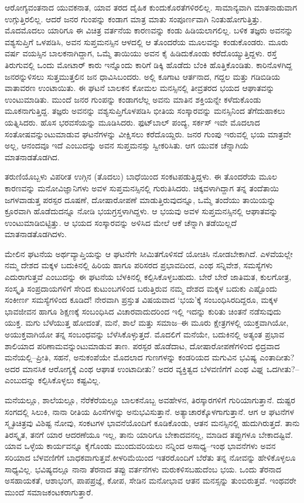 ಆರೋಗ್ಯವಂತನಾದ ಯುವಕನಾತ, ಯಾವ ತರದ ದೈಹಿಕ ಕುಂದುಕೊರತೆಗಳಿರಲಿಲ್ಲ. ಸಾಮಾನ್ಯವಾಗಿ ಮಾತನಾಡುವಾಗ ಉಗ್ಗುತ್ತಿರಲಿಲ್ಲ. ಆದರೆ ಜನರ ಗುಂಪನ್ನು ಕಂಡಾಗ ಮಾತ್ರ ಮಾತು ಸಂಪೂರ್ಣವಾಗಿ ನಿಂತುಹೋಗುತ್ತಿತ್ತು. ಮೊದಮೊದಲು ಯಾರಿಗೂ ಈ ವಿಚಿತ್ರ ವರ್ತನೆಯ ಕಾರಣವನ್ನು ಕಂಡು ಹಿಡಿಯಲಾಗಲಿಲ್ಲ. ಬಳಿಕ ತಜ್ಞರು ಅವನನ್ನು ವಶ್ಯಸುಪ್ತಿಗೆ ಒಳಪಡಿಸಿ, ಅವನ ಸುಪ್ತಮನಸ್ಸಿನ ಆಳದಲ್ಲಿ ಆ ತೊಂದರೆಯ ಮೂಲವನ್ನು ಕಂಡುಕೊಂಡರು. ಮೂರು ವರ್ಷ ವಯಸ್ಸಿನ ಬಾಲಕನಾಗಿದ್ದಾಗ, ಒಮ್ಮೆ ತಾಯಿಯು ಅವನ ಕೈ ಹಿಡಿದುಕೊಂಡು ಕರೆದೊಯ್ಯು\-ತ್ತಿದ್ದಳು. ರಸ್ತೆ ತಿರುಗುವಲ್ಲಿ ಒಂದು ಮೋಟಾರ್ ಕಾರು ಇನ್ನೊಂದು ಕಾರಿಗೆ ಡಿಕ್ಕಿ ಹೊಡೆದು ಬೆಂಕಿ ಹೊತ್ತಿ\-ಕೊಂಡಿತು. ಕಾರಿನೊಳಗಿದ್ದ ಜನರನ್ನುಳಿಸಲು ಸುತ್ತಮುತ್ತಲಿನ ಜನ ಧಾವಿಸಿ\-ಬಂದರು. ಅಲ್ಲಿ ಕೂಗಾಟ ಆರ್ತನಾದ, ಗದ್ದಲ ಮತ್ತು ಗಡಿಬಿಡಿಯ ವಾತಾವರಣ ಉಂಟಾಯಿತು. ಈ ಘಟನೆ ಬಾಲಕನ ಕೋಮಲ ಮನಸ್ಸಿನಲ್ಲಿ ತೀವ್ರತರದ ಭಯದ ಆಘಾತವನ್ನು ಉಂಟುಮಾಡಿತು. ಮುಂದೆ ಜನರ ಗುಂಪನ್ನು ಕಂಡಾಗಲೆಲ್ಲ ಅವನು ಮಾತಿನ ಶಕ್ತಿಯನ್ನೇ ಕಳೆದುಕೊಂಡು ಮೂಕ\-ನಾಗು\-ತ್ತಿದ್ದ. ತಜ್ಞರು ಅವನನ್ನು ವಶ್ಯಸುಪ್ತಿಗೊಳಪಡಿಸಿ ಭೀತಿಯ ಸಂಸ್ಕಾರವನ್ನು ಮನಸ್ಸಿನಿಂದ ತೆಗೆದುಹಾಕಲು ಯತ್ನಿಸಿದರು. ಹೊಸ ಭರವಸೆಯನ್ನು ಮೂಡಿಸಿದರು. ಫುಟ್​ಬಾಲ್ ಪಂದ್ಯ, ಸರ್ಕಸ್ ಇವೇ ಮೊದಲಾದ ಸಂತೋಷವನ್ನುಂಟುಮಾಡುವ ಘಟನೆಗಳನ್ನು ವೀಕ್ಷಿಸಲು ಕರೆ\-ದೊಯ್ದರು. ಜನರ ಗುಂಪು ಇರುವಲ್ಲಿ ಭಯ ಮಾತ್ರವೇ ಅಲ್ಲ, ಆನಂದವೂ ಇದೆ ಎಂಬುದನ್ನು ಅವನ ಸುಪ್ತಮನಸ್ಸು ಸ್ವೀಕರಿಸಿತು. ಆಗ ಯುವಕ ಚೆನ್ನಾಗಿಯೆ ಮಾತನಾಡತೊಡಗಿದ.

ತರುಣಿಯೊಬ್ಬಳು ವಿಪರೀತ ಉಗ್ಗಿನ (ತೊದಲು) ಬಾಧೆಯಿಂದ ಸಂಕಟಪಡುತ್ತಿದ್ದಳು. ಈ ತೊಂದರೆಯ ಮೂಲ ಕಾರಣವನ್ನು ಮನೋವಿಜ್ಞಾನಿಗಳು ಅವಳ ಸುಪ್ತಮನಸ್ಸಿನಲ್ಲಿ ಗುರುತಿಸಿದರು. ಚಿಕ್ಕವಳಾಗಿದ್ದಾಗ ತನ್ನ ತಂದೆತಾಯಿ ಜಗಳವಾಡುತ್ತ ಪರಸ್ಪರ ದೂಷಣೆ, ದೋಷಾರೋಪಣೆ ಮಾಡುತ್ತಿರುವುದನ್ನೂ, ಒಮ್ಮೆ ತಂದೆಯು ತಾಯಿಯನ್ನು ಕ್ರೂರವಾಗಿ ಹೊಡೆದುದನ್ನೂ ನೋಡಿ ಭಯಗ್ರಸ್ತಳಾಗಿದ್ದಳು. ಆ ಭಯವು ಅವಳ ಸುಪ್ತಮನಸ್ಸಿನಲ್ಲಿ ಆಘಾತವನ್ನು ಉಂಟುಮಾಡಿಬಿಟ್ಟಿತ್ತು. ಆ ಭಯದ ಸಂಸ್ಕಾರವನ್ನು ಅಳಿಸಿದ ಮೇಲೆ ಆಕೆ ಚೆನ್ನಾಗಿ ತಡೆಯಿಲ್ಲದೆ ಮಾತನಾಡತೊಡಗಿದಳು.

ಮೇಲಿನ ಘಟನೆಯ ಅರ್ಥವ್ಯಾಪ್ತಿಯನ್ನು ಆ ಘಟನೆಗೇ ಸೀಮಿತಗೊಳಿಸದೆ ಯೋಚಿಸಿ ನೋಡಬೇಕಾಗಿದೆ. ಎಳವೆಯಲ್ಲೇ ನಮ್ಮ ದೇಶದ ಮಕ್ಕಳ ಬದುಕಿನಲ್ಲಿ ಹಿರಿಯ ಹಾಗೂ ಪರಿಸರದ ಪ್ರಭಾವದಿಂದ, ಎಂಥ ಸನ್ನಿವೇಶ, ಸಮಸ್ಯೆಗಳು ಎದುರಾಗುತ್ತವೆ ಎಂಬುದನ್ನು ಈ ಘಟನೆಯ ಬೆಳಕಿನಲ್ಲಿ ಕಲ್ಪಿಸಿಕೊಳ್ಳಬಹುದು. ಬೇರೆ ಬೇರೆ ಜಾತಿಮತ, ಕುಲಗೋತ್ರ, ಸಂಸ್ಕೃತಿ ಸಂಪ್ರದಾಯಗಳಿಗೆ ಸೇರಿದ ಕುಟುಂಬಗಳಿಂದ ಬರುತ್ತಿರುವ ನಮ್ಮ ದೇಶದ ಮಕ್ಕಳ ಬದುಕು ಎಷ್ಟೊಂದು ಸಂಕೀರ್ಣ ಸಮಸ್ಯೆಗಳಿಂದ ಕೂಡಿದೆ! ನೇರವಾಗಿ ಪ್ರಸ್ತುತ ವಿಷಯವಾದ ‘ಭಯ’ಕ್ಕೆ ಸಂಬಂಧಿಸಿರ\-ದಿದ್ದರೂ, ಮಕ್ಕಳ ಭಾವಜೀವನ ಹಾಗೂ ಶಿಕ್ಷಣಕ್ಕೆ ಸಂಬಂಧಿಸಿದ ವಿಚಾರವಾದುದರಿಂದ ಇಲ್ಲಿ ಇದನ್ನು ಕುರಿತು ಚಿಂತನೆ ನಡೆಸುವುದು ಯುಕ್ತ. ಮಗು ಬೆಳೆಯುತ್ತ ಹೋದಂತೆ, ಮನೆ, ಶಾಲೆ ಮತ್ತು ಸಮಾಜ–ಈ ಮೂರು ಕ್ಷೇತ್ರಗಳಲ್ಲಿ ಯುಕ್ತವಾಗಿಯೋ, ಅಯುಕ್ತವಾಗಿಯೋ ತನ್ನ ಸಂಬಂಧವನ್ನು ಬೆಳೆಸಿಕೊಳ್ಳುತ್ತದೆ. ಮೊದಲಿಗೆ ಮನೆಯೇ, ಬದುಕಿನಲ್ಲಿ ಅತ್ಯಂತ ಪ್ರಭಾವ ಶಾಲಿಯಾದ ಪರಿಣಾಮವನ್ನುಂಟುಮಾಡುವ ತಾಣ. ಪರಸ್ಪರ ಹೊಡೆದಾಟ, ದೋಷಾರೋಪಣೆಗಳಿಂದ ಛಿದ್ರವಾದ ಮನೆಯಲ್ಲಿ–ಪ್ರೀತಿ, ಸಹನೆ, ಅನುಕಂಪೆಯೇ ಮೊದಲಾದ ಗುಣಗಳನ್ನು ಕಂಡರಿಯದ ಮಗುವಿನ ಭವಿಷ್ಯ ಎಂತಾದೀತು? ಅದರ ಮಾನಸಿಕ ಆರೋಗ್ಯಕ್ಕೆ ಎಂಥ ಆಘಾತ ಉಂಟಾದೀತು? ಅದರ ವ್ಯಕ್ತಿತ್ವದ ಬೆಳವಣಿಗೆಗೆ ಎಂಥ ವಿಘ್ನ ಒದಗೀತು?–ಎಂಬುದನ್ನು ಕಲ್ಪಿಸಿಕೊಳ್ಳಲು ಕಷ್ಟವಿಲ್ಲ.

ಮನೆಯಲ್ಲೂ, ಶಾಲೆಯಲ್ಲೂ, ನೆರೆಕೆರೆಯಲ್ಲೂ ಬಾಲಕನೊಬ್ಬ ಅವಹೇಳನ, ತಿರಸ್ಕಾರಗಳಿಗೆ ಗುರಿಯಾಗುತ್ತಾನೆ. ದುಷ್ಟರ ಸಂಗದಲ್ಲಿ ಸಿಲುಕಿ, ನಾನಾ ರೀತಿಯ ಹಿಂಸೆಗಳನ್ನು ಅನುಭವಿಸುತ್ತಾನೆ. ಅತ್ಯಾಚಾರಕ್ಕೊಳಗಾಗುತ್ತಾನೆ. ಆಗ ಆ ಘಟನೆಗಳ ಸ್ಮೃತಿಚಿತ್ರವು ವಿಶಿಷ್ಟ ನೋವು, ಸಂಕಟಗಳ ಭಾವನೆಯೊಂದಿಗೆ ಕೂಡಿಕೊಂಡು, ಆತನ ಮನಸ್ಸಿನಲ್ಲಿ ಹುದುಗಿರುತ್ತದೆ. ತಾನು ತಿರಸ್ಕೃತ, ತನಗೆ ಯಾರ ಆದರಣೆಯೂ ಇಲ್ಲ, ತಾನು ಯಾರಿಗೂ ಬೇಕಾದವನಲ್ಲ, ಮಾಡಿದ ತಪ್ಪುಗಳೂ ಬೇಕಾದಷ್ಟಿವೆ. ಯಾವ ಒಳ್ಳೆಯ ಕಾರ್ಯವನ್ನೂ ಕೈಗೊಂಡು ಮುಂದುವರಿಯಲು ನನ್ನಿಂದ ಅಸಾಧ್ಯ–ಇಂಥ ಭಾವನೆಗಳು ಅವನ ಸರಿಯಾದ ಬೆಳವಣಿಗೆಗೆ ಬಾಧಕವಾಗುತ್ತವೆ.\break ಕೀಳರಿಮೆಯಿಂದ ಇತರರೊಂದಿಗೆ ಬೆರೆತು ತನ್ನ ನೋವನ್ನು ಹೇಳಿಕೊಳ್ಳಲೂ ಸಾಧ್ಯವಿಲ್ಲ. ಭವಿಷ್ಯ\-ದಲ್ಲೂ ನಾನಾ ತೆರನಾದ ತಪ್ಪು ವರ್ತನೆಗಳು ಮರುಕಳಿಸಬಹುದೆಂಬ ಭಯ. ಒಂದು ತೆರನಾದ ಅಸಹಾಯಕತೆ, ಆಶಾಭಂಗ, ಪಾಪಪ್ರಜ್ಞೆ, ಕೋಪ, ಸೇಡಿನ ಮನೋಭಾವ ಆತನ ಮನಸ್ಸನ್ನು ತುಂಬಿರುತ್ತವೆ. ಇಂಥವರೇ ಮುಂದೆ ಸಮಾಜಕಂಟಕರಾಗುತ್ತಾರೆ.


